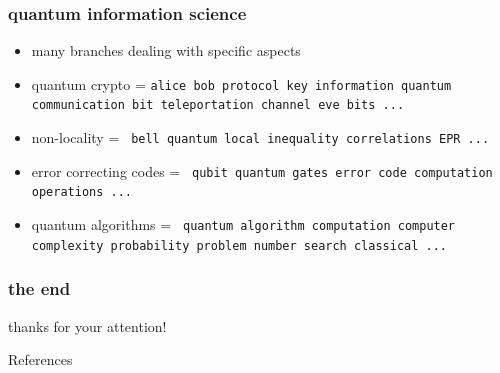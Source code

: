 \documentclass[12pt]{beamer}
\theoremstyle{plain}
\theoremstyle{definition}
\begin{document}
%


\begin{frame}
	\frametitle{quantum information science}
	\begin{itemize}
	\item many branches dealing with specific aspects
        \item quantum crypto = \texttt{alice bob protocol key information quantum communication bit teleportation channel eve bits ...}
        \item non-locality = \texttt{ bell quantum local inequality correlations EPR ... }
        \item error correcting codes = \texttt{ qubit quantum gates error code computation operations ...}

        \item quantum algorithms = \texttt{ quantum algorithm computation computer complexity probability problem number search classical ... }
	\end{itemize}
\end{frame}




\begin{frame}
	\frametitle{the end}
	\begin{center}
		\huge thanks for your attention!
	\end{center}
\end{frame}

\begin{frame}[allowframebreaks]{References}
    
    
\end{frame}
\end{document}
